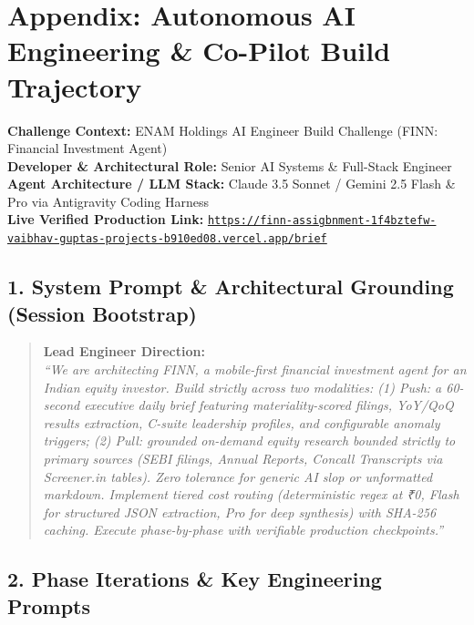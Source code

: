 \section*{Appendix: Autonomous AI Engineering & Co-Pilot Build Trajectory}

\noindent\textbf{Challenge Context:} ENAM Holdings AI Engineer Build Challenge (FINN: Financial Investment Agent) \\
\textbf{Developer \& Architectural Role:} Senior AI Systems \& Full-Stack Engineer \\
\textbf{Agent Architecture / LLM Stack:} Claude 3.5 Sonnet / Gemini 2.5 Flash \& Pro via Antigravity Coding Harness \\
\textbf{Live Verified Production Link:} \href{https://finn-assigbnment-1f4bztefw-vaibhav-guptas-projects-b910ed08.vercel.app/brief}{\texttt{https://finn-assigbnment-1f4bztefw-vaibhav-guptas-projects-b910ed08.vercel.app/brief}}

\vspace{0.8em}
\subsection*{1. System Prompt \& Architectural Grounding (Session Bootstrap)}
\begin{quote}
\small
\textbf{Lead Engineer Direction:} \\
\textit{``We are architecting FINN, a mobile-first financial investment agent for an Indian equity investor. Build strictly across two modalities: (1) Push: a 60-second executive daily brief featuring materiality-scored filings, YoY/QoQ results extraction, C-suite leadership profiles, and configurable anomaly triggers; (2) Pull: grounded on-demand equity research bounded strictly to primary sources (SEBI filings, Annual Reports, Concall Transcripts via Screener.in tables). Zero tolerance for generic AI slop or unformatted markdown. Implement tiered cost routing (deterministic regex at ₹0, Flash for structured JSON extraction, Pro for deep synthesis) with SHA-256 caching. Execute phase-by-phase with verifiable production checkpoints.''}
\end{quote}

\vspace{0.5em}
\subsection*{2. Phase Iterations \& Key Engineering Prompts}


